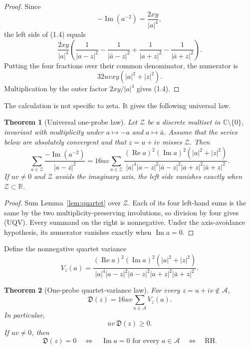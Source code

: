 \documentclass[11pt]{article}
\newtheorem{theorem}{Theorem}[section]
\theoremstyle{definition}
\theoremstyle{remark}
\newcommand{\C}{\mathbb C}
\newcommand{\R}{\mathbb R}
\newcommand{\cA}{\mathcal A}
\newcommand{\Rea}{\operatorname{Re}}
\newcommand{\Ima}{\operatorname{Im}}
\begin{document}
\begin{proof}
Since
\[
 -\Ima(a^{-2})=\frac{2xy}{|a|^4},
\]
the left side of (1.4) equals
\[
 \frac{2xy}{|a|^4}
 \left(
 \frac1{|a-z|^2}-\frac1{|\bar a-z|^2}
 +\frac1{|a+z|^2}-\frac1{|\bar a+z|^2}
 \right).
\]
Putting the four fractions over their common denominator, the numerator is
\[
 32uvxy(|a|^2+|z|^2).
\]
Multiplication by the outer factor $2xy/|a|^4$ gives (1.4).
\end{proof}

The calculation is not specific to zeta.  It gives the following universal law.

\begin{theorem}[Universal one-probe law]
\label{thm:universal}
Let $\mathcal Z$ be a discrete multiset in $\C\setminus\{0\}$, invariant with multiplicity under
$a\mapsto-a$ and $a\mapsto\bar a$.  Assume that the series below are absolutely convergent and
that $z=u+iv$ misses $\mathcal Z$.  Then
\begin{equation}
 \sum_{a\in\mathcal Z}\frac{-\Ima(a^{-2})}{|a-z|^2}
 =16uv\sum_{a\in\mathcal Z}
 \frac{(\Rea a)^2(\Ima a)^2(|a|^2+|z|^2)}
 {|a|^4|a-z|^2|\bar a-z|^2|a+z|^2|\bar a+z|^2}.          \tag{UQV}
\end{equation}
If $uv\ne0$ and $\mathcal Z$ avoids the imaginary axis, the left side vanishes exactly when
$\mathcal Z\subset\R$.
\end{theorem}

\begin{proof}
Sum Lemma~\ref{lem:quartet} over $\mathcal Z$.  Each of its four left-hand sums is the same by
the two multiplicity-preserving involutions, so division by four gives (UQV).  Every summand on
the right is nonnegative.  Under the axis-avoidance hypothesis, its numerator vanishes exactly
when $\Ima a=0$.
\end{proof}

Define the nonnegative quartet variance
\begin{equation}
 V_z(a)=
 \frac{(\Rea a)^2(\Ima a)^2(|a|^2+|z|^2)}
 {|a|^4|a-z|^2|\bar a-z|^2|a+z|^2|\bar a+z|^2}.          \tag{1.5}
\end{equation}

\begin{theorem}[One-probe quartet-variance law]
\label{thm:variance}
For every $z=u+iv\notin\cA$,
\begin{equation}
 \boxed{\quad \mathfrak D(z)=16uv\sum_{a\in\cA}V_z(a).\quad} \tag{1.6}
\end{equation}
In particular,
\begin{equation}
 uv\,\mathfrak D(z)\geq0.                                 \tag{1.7}
\end{equation}
If $uv\ne0$, then
\begin{equation}
 \mathfrak D(z)=0
 \quad\Longleftrightarrow\quad
 \Ima a=0\text{ for every }a\in\cA
 \quad\Longleftrightarrow\quad\mathrm{RH}.              \tag{1.8}
\end{equation}
\end{theorem}
\end{document}
